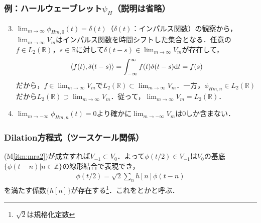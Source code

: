 \documentclass[dvipdfmx,graphicx,14pt]{beamer}
\begin{document}
\begin{frame}[c]
    \frametitle{例：ハールウェーブレット$\psi_{H}$\small（説明は省略）}
    \begin{enumerate}[(M1)]
            \setcounter{enumi}{2}
        \item \small
            $\displaystyle\lim_{m\to\infty} \phi_{Hm,0}(t) = \delta(t)$（$\delta(t)$：インパルス関数）の観察から，$\displaystyle\lim_{m\to\infty}V_{m}$はインパルス関数を時間シフトした集合となる．任意の$f \in L_{2}(\mathbb{R})$，$s \in \mathbb{R}$に対して$\delta(t - s) \in \displaystyle\lim_{m\to\infty}V_{m}$が存在して，
            \begin{align*}
                \langle f(t), \delta(t - s) \rangle = \int_{-\infty}^{\infty} f(t) \delta(t - s) \mathrm{d} t = f(s)
            \end{align*}
            だから，$f \in \displaystyle\lim_{m\to\infty}V_{m}$で$L_{2}(\mathbb{R}) \subset \displaystyle\lim_{m\to\infty}V_{m}$．一方，$\phi_{Hm,n} \in L_{2}(\mathbb{R})$だから$L_{2}(\mathbb{R})\supset \displaystyle\lim_{m\to\infty}V_{m}$．従って，$\displaystyle\lim_{m\to\infty}V_{m} = L_{2}(\mathbb{R})$．
            \normalsize
        \item $\displaystyle\lim_{m\to-\infty} \phi_{Hm,n}(t) = 0$より確かに$\displaystyle\lim_{m\to-\infty}V_{m}$は$0$しか含まない．
    \end{enumerate}
\end{frame}

\begin{frame}[c]
    \frametitle{Dilation方程式（ツースケール関係）}
    (M\ref{itm:mra2})が成立すれば$V_{-1} \subset V_{0}$．よって$\phi(t/2) \in V_{-1}$は$V_{0}$の基底$\{ \phi(t-n) | n \in \mathbb{Z} \}$の線形結合で表現でき，
    \begin{align}
        \phi(t/2) = \sqrt{2} \sum_{n} h[n] \phi(t - n) \label{eq:dilation_eq}
    \end{align}
    を満たす係数$\{ h[n] \}$が存在する\footnote{$\sqrt{2}$は規格化定数}．これをとかと呼ぶ．
\end{frame}
\end{document}
